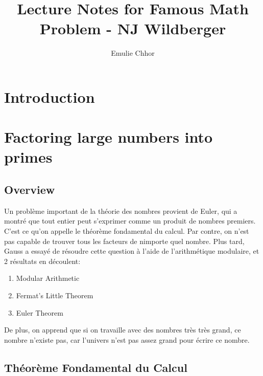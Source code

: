 \documentclass{article}
\begin{document}
\title{Lecture Notes for Famous Math Problem - NJ Wildberger}
\author{Emulie Chhor}
\maketitle

\section*{Introduction}

\newtheorem{definition}{Definition}[subsection]
\newtheorem{theorem}{Theorem}[subsection]
\newtheorem{corollary}{Corollary}[subsection]
\newtheorem{lemma}[theorem]{Lemma}
\newtheorem{proposition}{Proposition}[section]
\newtheorem{axiom}{Axiome}
\newtheorem{property}{Propriété}[subsection]
\newtheorem*{remark}{Remarque}
\newtheorem*{problem}{Problème}
\newtheorem*{intuition}{Intuition}

\section{Factoring large numbers into primes}

\subsection{Overview}%
\label{sub:Overview}

Un problème important de la théorie des nombres provient de Euler,
qui a montré que tout entier peut s'exprimer comme un produit de
nombres premiers. C'est ce qu'on appelle le théorème fondamental du
calcul. Par contre, on n'est pas capable de trouver tous les facteurs
de nimporte quel nombre. Plus tard, Gauss a essayé de résoudre cette
question à l'aide de l'arithmétique modulaire, et 2 résultats en découlent:
\begin{enumerate}
    \item Modular Arithmetic
    \item Fermat's Little Theorem
    \item Euler Theorem
\end{enumerate}

De plus, on apprend que si on travaille avec des nombres très très grand,
ce nombre n'existe pas, car l'univers n'est pas assez grand pour écrire
ce nombre.

\subsection{Théorème Fondamental du Calcul}
\end{document}
